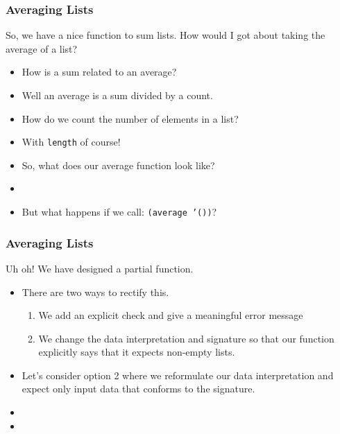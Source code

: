 \documentclass{beamer}
\begin{document}
\begin{frame}
  \frametitle{Averaging Lists}
  So, we have a nice function to sum lists. How would I got about
  taking the average of a list?
  \begin{itemize}
  \item<2-> How is a sum related to an average?
  \item<3-> Well an average is a sum divided by a count.
  \item<4-> How do we count the number of elements in a list?
  \item<5-> With \texttt{length} of course!
  \item<6-> So, what does our average function look like?
  \item<7-> \average
  \item<8-> But what happens if we call:
    \texttt{(average '())}?
  \end{itemize}
\end{frame}



\begin{frame}
  \frametitle{Averaging Lists}
  Uh oh! We have designed a partial function.
  \begin{itemize}
  \item<2-> There are two ways to rectify this.
    \begin{enumerate}
    \item<3-> We add an explicit check and give a meaningful
      error message
    \item<4-> We change the data interpretation and signature so that our function explicitly
      says that it expects non-empty lists.
    \end{enumerate}
  \item<5-> Let's consider option 2 where we reformulate our
    data interpretation and expect only input data that conforms to the signature.
  \item<6-> \NonEmpty
  \item<7-> \averageNE  
  \end{itemize}
\end{frame}
\end{document}
